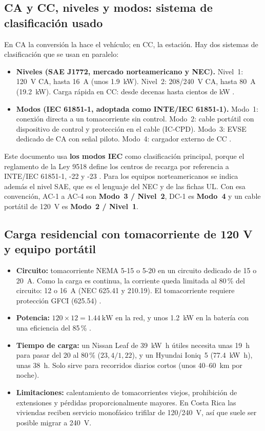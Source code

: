 \subsection{CA y CC, niveles y modos: sistema de clasificación usado}
En CA la conversión la hace el vehículo; en CC, la estación. Hay dos sistemas de clasificación que se usan en paralelo:
\begin{itemize}
\item \textbf{Niveles (SAE J1772, mercado norteamericano y NEC).} Nivel~1: 120~V CA, hasta \SI{16}{\ampere} (unos \SI{1.9}{\kilo\watt}). Nivel~2: 208/240~V CA, hasta \SI{80}{\ampere} (\SI{19.2}{\kilo\watt}). Carga rápida en CC: desde decenas hasta cientos de kW \cite{sae1772}.
\item \textbf{Modos (IEC 61851-1, adoptada como INTE/IEC 61851-1).} Modo~1: conexión directa a un tomacorriente sin control. Modo~2: cable portátil con dispositivo de control y protección en el cable (IC-CPD). Modo~3: EVSE dedicado de CA con señal piloto. Modo~4: cargador externo de CC \cite{iec61851,intecoBlog}.
\end{itemize}
Este documento usa \textbf{los modos IEC} como clasificación principal, porque el reglamento de la Ley 9518 define los centros de recarga por referencia a INTE/IEC 61851-1, -22 y -23 \cite{dec41428}. Para los equipos norteamericanos se indica además el nivel SAE, que es el lenguaje del NEC y de las fichas UL. Con esa convención, AC-1 a AC-4 son \textbf{Modo~3 / Nivel~2}, DC-1 es \textbf{Modo~4} y un cable portátil de 120~V es \textbf{Modo~2 / Nivel~1}.

\subsection{Carga residencial con tomacorriente de 120 V y equipo portátil}
\begin{itemize}
\item \textbf{Circuito:} tomacorriente NEMA 5-15 o 5-20 en un circuito dedicado de 15 o \SI{20}{\ampere}. Como la carga es continua, la corriente queda limitada al 80\,\% del circuito: 12 o \SI{16}{\ampere} (NEC 625.41 y 210.19). El tomacorriente requiere protección GFCI (625.54) \cite{nfpa70}.
\item \textbf{Potencia:} $120 \times 12 = \SI{1.44}{\kilo\watt}$ en la red, y unos \SI{1.2}{\kilo\watt} en la batería con una eficiencia del 85\,\% \supuesto{}.
\item \textbf{Tiempo de carga:} un Nissan Leaf de \SI{39}{\kilo\watt\hour} útiles necesita unas 19~h para pasar del 20 al 80\,\% ($23{,}4/1{,}22$), y un Hyundai Ioniq~5 (\SI{77.4}{\kilo\watt\hour}), unas 38~h. Solo sirve para recorridos diarios cortos (unos 40--60~km por noche).
\item \textbf{Limitaciones:} calentamiento de tomacorrientes viejos, prohibición de extensiones y pérdidas proporcionalmente mayores. En Costa Rica las viviendas reciben servicio monofásico trifilar de 120/240~V, así que suele ser posible migrar a 240~V.
\end{itemize}

